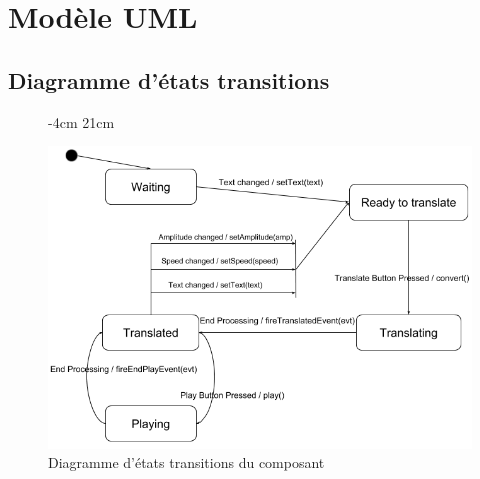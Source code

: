 \documentclass[a4paper,11pt]{article}
\begin{document}
    \section{Modèle UML}
    \subsection{Diagramme d'états transitions}
    \begin{figure}[H]
         -4cm 21cm
        \begin{center}
            \includegraphics[scale=0.8]{etatsdiag.png}
            \caption{Diagramme d'états transitions du composant}
            \label{Diagramme d'états transitions du composant}
        \end{center}
    \end{figure}
\end{document}
